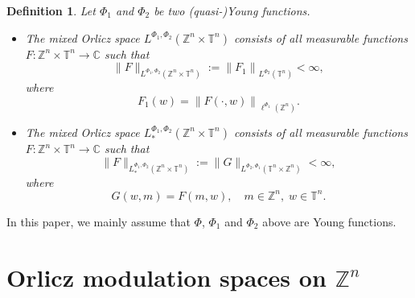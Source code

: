 \documentclass[a4paper,11pt, reqno]{amsart}
\theoremstyle{plain}
\newtheorem{Def}[theorem]{Definition}
\theoremstyle{definition}
\theoremstyle{remark}
\def \Z{{\mathbb Z}}
\def \T{{\mathbb T}}
\begin{document}
\begin{Def}
Let $\Phi_1$ and $\Phi_2$ be two (quasi-)Young functions. 
\begin{itemize}
\item[(1)] The mixed Orlicz space $L^{\Phi_1, \Phi_2} (\Z^n \times \T^n)$ consists of all measurable functions $F: \Z^n \times \T^n \rightarrow \mathbb{C}$ such that $$\|F\|_{L^{\Phi_1, \Phi_2} ( \Z^n \times \T^n)} := \left\|F_{1}\right\|_{L^{\Phi_2}(\T^n)} < \infty,$$
where
$$ F_{1} \left(w\right)=\left\| F\left(\cdot, w \right) \right\|_{\ell^{\Phi_1} (\Z^n)}.$$

\item[(2)]  The mixed Orlicz space $L_{*}^{\Phi_1, \Phi_2} (\Z^n \times \T^n)$ consists of all measurable functions $F: \Z^n \times \T^n \rightarrow \mathbb{C}$ such that $$\| F \|_{L_{*}^{\Phi_1, \Phi_2}(\Z^n \times \T^n)} := \| G \|_{L^{\Phi_2, \Phi_1} (\T^n \times \Z^n)} < \infty, $$ where $$G(w, m)=F(m, w), \quad m \in \Z^n, \; w \in \T^n.$$
\end{itemize}
\end{Def} 
In this paper, we mainly assume that $\Phi$, $\Phi_1$ and $\Phi_2$ above are Young functions. 

\section{Orlicz modulation spaces on $\Z^n$}\label{sec3}
\end{document}

